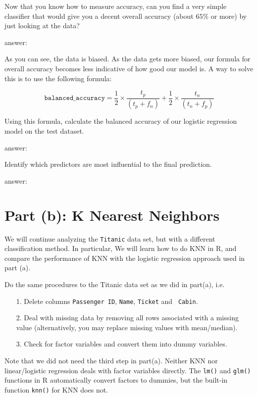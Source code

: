 \documentclass{article}
\newcommand{\answerbox}[1]{
	\begin{center}
		\ifdefined\printsol
			\begin{mdframed}
				\begin{minipage}{0.95\textwidth}
					{\color{blue} {#1}}
				\end{minipage}
			\end{mdframed}
		\else
			\begin{mdframed}
				\begin{minipage}{0.95\textwidth}
					\phantom{\parbox{\linewidth}{#1}}
				\end{minipage}
			\end{mdframed}
		\fi
		\end{center}
	}
\begin{document}
Now that you know how to measure accuracy, can you find a very simple
classifier that would give you a decent overall accuracy (about $65\%$
or more) by just looking at the data?

\answerbox{
  answer:
}

\bigskip

As you can see, the data is biased. As the data gets more biased, our
formula for overall accuracy becomes less indicative of how good our model is. A
way to solve this is to use the following formula:

\[
    \mathtt{balanced\_accuracy} =
    \frac{1}{2} \times \frac{t_p}{(t_p+f_n)} + \frac{1}{2} \times
    \frac{t_n}{(t_n+f_p)}
\]

Using this formula, calculate the balanced accuracy of our logistic
regression model on the test dataset.

\answerbox{
	answer:
}

Identify which predictors are most influential to the final
prediction.

\answerbox{
	answer:
}


\section*{Part (b): K Nearest Neighbors}

We will continue analyzing the \texttt{Titanic} data set, but with a different classification method. In particular, We will learn how to do KNN in R, and compare the performance of KNN with the logistic regression approach used in part (a).

\bigskip

Do the same procedures to the Titanic data set as we did in part(a), i.e.
\begin{itemize}
\item[1.] Delete columns {\tt Passenger ID}, {\tt Name}, {\tt Ticket} and {\tt
Cabin}.
\item[2.] Deal with missing data by removing all rows associated with a missing
value (alternatively, you may replace missing values with mean/median).
\item[3.] Check for factor variables and convert them into dummy variables.
\end{itemize}
Note that we did not need the third step in part(a). Neither KNN nor linear/logistic regression deals with factor variables directly. The \texttt{lm()} and \texttt{glm()} functions in R automatically convert factors to dummies, but the built-in function \texttt{knn()} for KNN does not.\\
\end{document}
